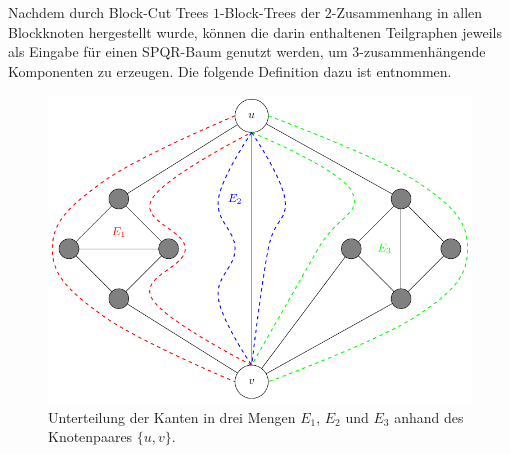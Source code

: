 Nachdem durch Block-Cut Trees \bzw $1$-Block-Trees der $2$-Zusammenhang in allen Blockknoten hergestellt wurde, können die darin enthaltenen Teilgraphen jeweils als Eingabe für einen SPQR-Baum genutzt werden, um $3$-zusammenhängende Komponenten zu erzeugen.
Die folgende Definition dazu ist \cite{GuM00} entnommen.

\begin{figure}[H]
  \centering
  \includegraphics[width=\textwidth,height=\textheight,keepaspectratio]{bilder/Split-Kantenmengen.pdf}
  \caption{Unterteilung der Kanten in drei Mengen $E_1$, $E_2$ und $E_3$ anhand des Knotenpaares $\{u, v\}$.}
  \label{fig:Split-Kantenmengen}
\end{figure}

